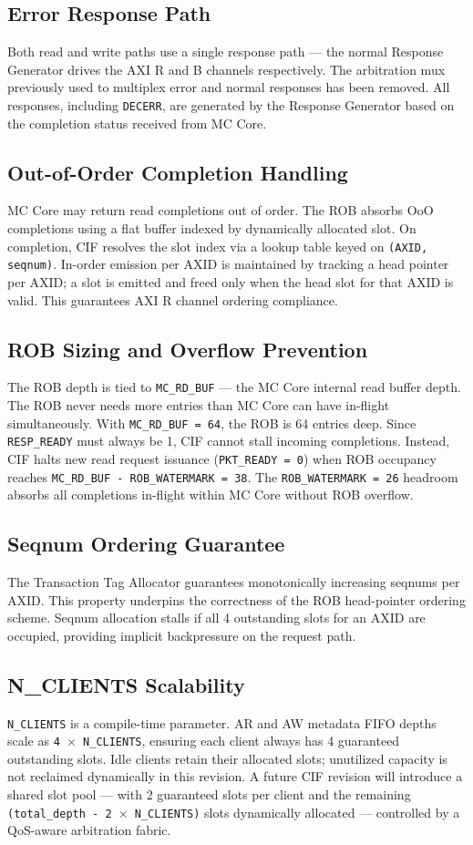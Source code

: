 \documentclass[11pt, a4paper]{article}
\begin{document}
\subsection{Error Response Path}
Both read and write paths use a single response path — the normal Response Generator drives the AXI R and B channels respectively. The arbitration mux previously used to multiplex error and normal responses has been removed. All responses, including \texttt{DECERR}, are generated by the Response Generator based on the completion status received from MC Core.

\subsection{Out-of-Order Completion Handling}
MC Core may return read completions out of order. The ROB absorbs OoO completions using a flat buffer indexed by dynamically allocated slot. On completion, CIF resolves the slot index via a lookup table keyed on \texttt{(AXID, seqnum)}. In-order emission per AXID is maintained by tracking a head pointer per AXID; a slot is emitted and freed only when the head slot for that AXID is valid. This guarantees AXI R channel ordering compliance.

\subsection{ROB Sizing and Overflow Prevention}
The ROB depth is tied to \texttt{MC\_RD\_BUF} — the MC Core internal read buffer depth. The ROB never needs more entries than MC Core can have in-flight simultaneously. With \texttt{MC\_RD\_BUF = 64}, the ROB is 64 entries deep. Since \texttt{RESP\_READY} must always be 1, CIF cannot stall incoming completions. Instead, CIF halts new read request issuance (\texttt{PKT\_READY = 0}) when ROB occupancy reaches \texttt{MC\_RD\_BUF - ROB\_WATERMARK = 38}. The \texttt{ROB\_WATERMARK = 26} headroom absorbs all completions in-flight within MC Core without ROB overflow.

\subsection{Seqnum Ordering Guarantee}
The Transaction Tag Allocator guarantees monotonically increasing seqnums per AXID. This property underpins the correctness of the ROB head-pointer ordering scheme. Seqnum allocation stalls if all 4 outstanding slots for an AXID are occupied, providing implicit backpressure on the request path.

\subsection{N\_CLIENTS Scalability}
\texttt{N\_CLIENTS} is a compile-time parameter. AR and AW metadata FIFO depths scale as \texttt{4 $\times$ N\_CLIENTS}, ensuring each client always has 4 guaranteed outstanding slots. Idle clients retain their allocated slots; unutilized capacity is not reclaimed dynamically in this revision. A future CIF revision will introduce a shared slot pool — with 2 guaranteed slots per client and the remaining \texttt{(total\_depth - 2 $\times$ N\_CLIENTS)} slots dynamically allocated — controlled by a QoS-aware arbitration fabric.
\end{document}
